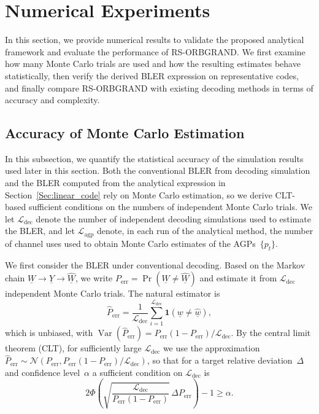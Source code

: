 \documentclass[letterpaper,draftclsnofoot,onecolumn]{IEEEtran}
\begin{document}
\section{Numerical Experiments}\label{Sec:simulation}

In this section, we provide numerical results to validate the proposed analytical framework and evaluate the performance of RS-ORBGRAND. We first examine how many Monte Carlo trials are used and how the resulting estimates behave statistically, then verify the derived BLER expression on representative codes, and finally compare RS-ORBGRAND with existing decoding methods in terms of accuracy and complexity.

\subsection{Accuracy of Monte Carlo Estimation}
\label{SubSec:Err_analysis}

In this subsection, we quantify the statistical accuracy of the simulation results used later in this section. Both the conventional BLER from decoding simulation and the BLER computed from the analytical expression in Section~\ref{Sec:linear_code} rely on Monte Carlo estimation, so we derive CLT-based sufficient conditions on the numbers of independent Monte Carlo trials. We let $\mathcal{L}_{\text{dec}}$ denote the number of independent decoding simulations used to estimate the BLER, and let $\mathcal{L}_{\text{agp}}$ denote, in each run of the analytical method, the number of channel uses used to obtain Monte Carlo estimates of the AGPs~$\{p_t\}$.

We first consider the BLER under conventional decoding. Based on the Markov chain $\underline{W}\rightarrow \underline{Y}\rightarrow \hat{\underline{W}}$, we write $P_{\text{err}} = \Pr(\underline{W} \neq \hat{\underline{W}})$ and estimate it from $\mathcal{L}_{\text{dec}}$ independent Monte Carlo trials. The natural estimator is
\begin{equation}\label{eq:decoding_bler_estimator}
\hat{P}_{\text{err}} = \frac{1}{\mathcal{L}_{\text{dec}}} \sum_{i=1}^{\mathcal{L}_{\text{dec}}} \mathbf{1}(\underline{w} \neq \hat{\underline{w}}),
\end{equation}
which is unbiased, with $\operatorname{Var}(\hat{P}_{\text{err}}) = P_{\text{err}}(1 - P_{\text{err}})/\mathcal{L}_{\text{dec}}$. By the central limit theorem (CLT), for sufficiently large $\mathcal{L}_{\text{dec}}$ we use the approximation $\hat{P}_{\text{err}} \sim \mathcal{N}\!\left(P_{\text{err}}, P_{\text{err}}(1 - P_{\text{err}})/\mathcal{L}_{\text{dec}}\right)$, so that for a target relative deviation~$\Delta$ and confidence level~$\alpha$ a sufficient condition on $\mathcal{L}_{\text{dec}}$ is
\begin{equation}\label{eq:decoding_clt_condition}
2\Phi\!\left(\sqrt{\frac{\mathcal{L}_{\text{dec}}}{P_{\text{err}}(1 - P_{\text{err}})}} \, \Delta P_{\text{err}} \right) - 1 \geq \alpha.
\end{equation}
\end{document}
